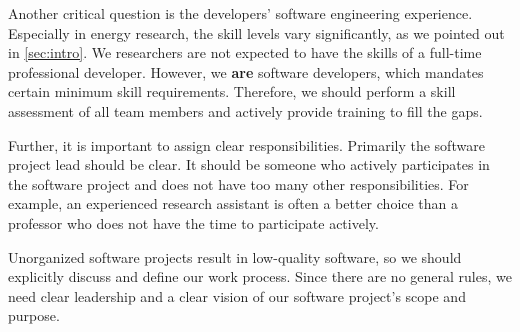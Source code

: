 Another critical question is the developers' software engineering experience. Especially in energy research, the skill levels vary significantly, as we pointed out in \autoref{sec:intro}. 
We researchers are not expected to have the skills of a full-time professional developer. However, we \textbf{are} software developers, which mandates certain minimum skill requirements. Therefore, we should perform a skill assessment of all team members and actively provide training to fill the gaps. 
\par 
Further, it is important to assign clear responsibilities. Primarily the software project lead should be clear. It should be someone who actively participates in the software project and does not have too many other responsibilities. For example, an experienced research assistant is often a better choice than a professor who does not have the time to participate actively.

\par 
Unorganized software projects result in low-quality software, so we should explicitly discuss and define our work process. Since there are no general rules, we need clear leadership and a clear vision of our software project's scope and purpose.

